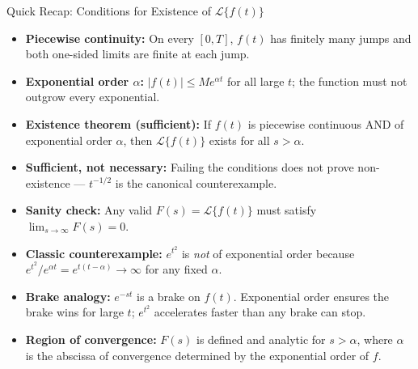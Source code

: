 \documentclass[12pt,a4paper]{article}
\begin{document}
\begin{learnbox}{Quick Recap: Conditions for Existence of $\mathcal{L}\{f(t)\}$}
\begin{itemize}
  \item \textbf{Piecewise continuity:} On every $[0,T]$, $f(t)$ has finitely many jumps and both
        one-sided limits are finite at each jump.
  \item \textbf{Exponential order $\alpha$:} $|f(t)| \leq M e^{\alpha t}$ for all large $t$;
        the function must not outgrow every exponential.
  \item \textbf{Existence theorem (sufficient):} If $f(t)$ is piecewise continuous AND of
        exponential order $\alpha$, then $\mathcal{L}\{f(t)\}$ exists for all $s > \alpha$.
  \item \textbf{Sufficient, not necessary:} Failing the conditions does not prove
        non-existence --- $t^{-1/2}$ is the canonical counterexample.
  \item \textbf{Sanity check:} Any valid $F(s) = \mathcal{L}\{f(t)\}$ must satisfy
        $\lim_{s \to \infty} F(s) = 0$.
  \item \textbf{Classic counterexample:} $e^{t^2}$ is \emph{not} of exponential order because
        $e^{t^2}/e^{\alpha t} = e^{t(t-\alpha)} \to \infty$ for any fixed $\alpha$.
  \item \textbf{Brake analogy:} $e^{-st}$ is a brake on $f(t)$.
        Exponential order ensures the brake wins for large $t$; $e^{t^2}$ accelerates faster
        than any brake can stop.
  \item \textbf{Region of convergence:} $F(s)$ is defined and analytic for $s > \alpha$, where
        $\alpha$ is the abscissa of convergence determined by the exponential order of $f$.
\end{itemize}
\end{learnbox}
\end{document}
